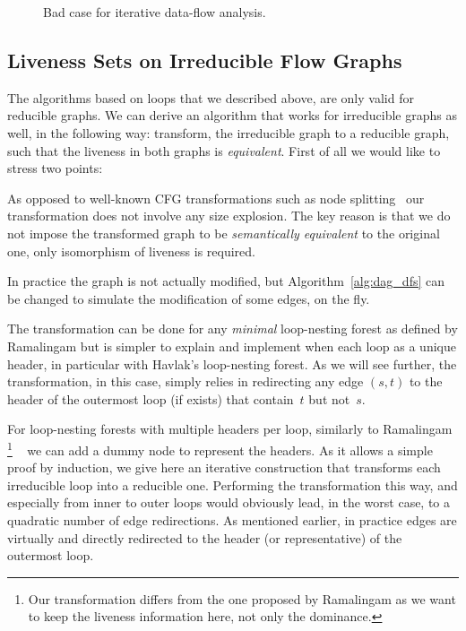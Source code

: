 \begin{figure}[t]
   \begin{center}
   \end{center}
   \caption{Bad case for iterative data-flow analysis.}
   \label{fig:liveness_dataflow}
\end{figure}


 \subsection{Liveness Sets on Irreducible Flow Graphs}
\label{sec:irreducible}

The algorithms based on loops that we described above, are only valid for reducible graphs.
We can derive an algorithm that works for irreducible graphs as well, in the following way:
transform, the irreducible graph to a reducible graph, such that the liveness in both graphs is \emph{equivalent}.
First of all we would like to stress two points:
\begin{asparaenum}[(1)]
\item
	As opposed to well-known CFG transformations such as node splitting~\cite{JC97,ASU06} our transformation does not involve any size explosion.
The key reason is that we do not impose the transformed graph to be \emph{semantically equivalent} to the original one, only isomorphism of liveness is required.
\item
	In practice the graph is not actually modified, but Algorithm~\ref{alg:dag_dfs} can be changed to simulate the modification of some edges, on the fly.
\end{asparaenum}

The transformation can be done for any \emph{minimal} loop-nesting forest as defined by Ramalingam but is simpler to explain and implement when each loop as a unique header, in particular with Havlak's loop-nesting forest.
As we will see further, the transformation, in this case, simply relies in redirecting any edge $(s,t)$ to the header of the outermost loop (if exists) that contain~$t$ but not~$s$.

For loop-nesting forests with multiple headers per loop, similarly to Ramalingam%
\footnote{Our transformation differs from the one proposed by Ramalingam as we want to keep the liveness information here, not only the dominance.}%
~\cite{ramalingam:2002:loopforest:minimal} we can add a dummy node to represent the headers.
As it allows a simple proof by induction, we give here an iterative construction that transforms each irreducible loop into a reducible one.
Performing the transformation this way, and especially from inner to outer loops would obviously lead, in the worst case, to a quadratic number of edge redirections.
As mentioned earlier, in practice edges are virtually and directly redirected to the header (or representative) of the outermost loop.

